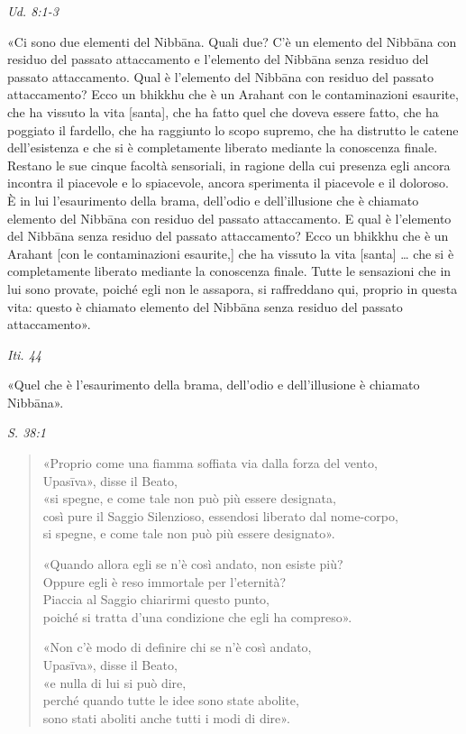 \emph{Ud. 8:1-3}


«Ci sono due elementi del Nibbāna. Quali due? C’è un elemento del
Nibbāna con residuo del passato attaccamento e l’elemento del Nibbāna
senza residuo del passato attaccamento. Qual è l’elemento del Nibbāna
con residuo del passato attaccamento? Ecco un bhikkhu che è un Arahant
con le contaminazioni esaurite, che ha vissuto la vita [santa], che ha
fatto quel che doveva essere fatto, che ha poggiato il fardello, che ha
raggiunto lo scopo supremo, che ha distrutto le catene dell’esistenza e
che si è completamente liberato mediante la conoscenza finale. Restano
le sue cinque facoltà sensoriali, in ragione della cui presenza egli
ancora incontra il piacevole e lo spiacevole, ancora sperimenta il
piacevole e il doloroso. È in lui l’esaurimento della brama, dell’odio e
dell’illusione che è chiamato elemento del Nibbāna con residuo del
passato attaccamento. E qual è l’elemento del Nibbāna senza residuo del
passato attaccamento? Ecco un bhikkhu che è un Arahant [con le
contaminazioni esaurite,] che ha vissuto la vita [santa] …​ che si è
completamente liberato mediante la conoscenza finale. Tutte le
sensazioni che in lui sono provate, poiché egli non le assapora, si
raffreddano qui, proprio in questa vita: questo è chiamato elemento del
Nibbāna senza residuo del passato attaccamento».


\emph{Iti. 44}


«Quel che è l’esaurimento della brama, dell’odio e dell’illusione è
chiamato Nibbāna».


\emph{S. 38:1}


\begin{quote}
«Proprio come una fiamma soffiata via dalla forza del vento, \\
Upasīva», disse il Beato, \\
«si spegne, e come tale non può più essere designata, \\
così pure il Saggio Silenzioso, essendosi liberato dal nome-corpo, \\
si spegne, e come tale non può più essere designato».


«Quando allora egli se n’è così andato, non esiste più? \\
Oppure egli è reso immortale per l’eternità? \\
Piaccia al Saggio chiarirmi questo punto, \\
poiché si tratta d’una condizione che egli ha compreso».


«Non c’è modo di definire chi se n’è così andato, \\
Upasīva», disse il Beato, \\
«e nulla di lui si può dire, \\
perché quando tutte le idee sono state abolite, \\
sono stati aboliti anche tutti i modi di dire».
\end{quote}

